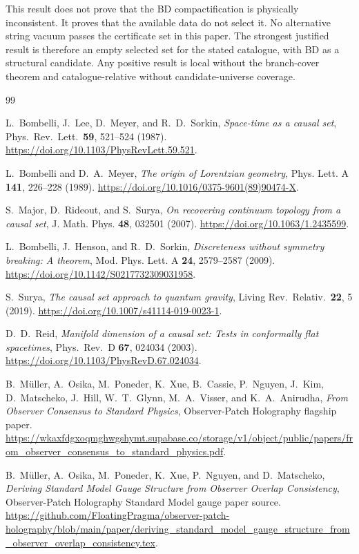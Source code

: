 \documentclass[11pt]{article}
\theoremstyle{remark}
\theoremstyle{plain}
\begin{document}
This result does not prove that the BD compactification is physically inconsistent. It proves that
the available data do not select it. No alternative string vacuum passes the certificate set in
this paper. The strongest justified result is therefore an empty selected set for the stated
catalogue, with BD as a structural candidate. Any positive result is local without
the branch-cover theorem and catalogue-relative without candidate-universe coverage.

\begin{thebibliography}{99}

L.~Bombelli, J.~Lee, D.~Meyer, and R.~D.~Sorkin,
\emph{Space-time as a causal set},
Phys.\ Rev.\ Lett.\ \textbf{59}, 521--524 (1987).
\url{https://doi.org/10.1103/PhysRevLett.59.521}.

L.~Bombelli and D.~A.~Meyer,
\emph{The origin of Lorentzian geometry},
Phys. Lett. A \textbf{141}, 226--228 (1989).
\url{https://doi.org/10.1016/0375-9601(89)90474-X}.

S.~Major, D.~Rideout, and S.~Surya,
\emph{On recovering continuum topology from a causal set},
J. Math. Phys. \textbf{48}, 032501 (2007).
\url{https://doi.org/10.1063/1.2435599}.

L.~Bombelli, J.~Henson, and R.~D.~Sorkin,
\emph{Discreteness without symmetry breaking: A theorem},
Mod. Phys. Lett. A \textbf{24}, 2579--2587 (2009).
\url{https://doi.org/10.1142/S0217732309031958}.

S.~Surya,
\emph{The causal set approach to quantum gravity},
Living Rev.\ Relativ.\ \textbf{22}, 5 (2019).
\url{https://doi.org/10.1007/s41114-019-0023-1}.

D.~D.~Reid,
\emph{Manifold dimension of a causal set: Tests in conformally flat spacetimes},
Phys.\ Rev.\ D \textbf{67}, 024034 (2003).
\url{https://doi.org/10.1103/PhysRevD.67.024034}.

B.\ M\"uller, A.\ Osika, M.\ Poneder, K.\ Xue, B.\ Cassie, P.\ Nguyen, J.\ Kim, D.\ Matscheko, J.\ Hill, W.\ T.\ Glynn, M.\ A.\ Visser, and K.\ A.\ Anirudha,
\emph{From Observer Consensus to Standard Physics},
Observer-Patch Holography flagship paper.
\url{https://wkaxfdgxoqmghwgshymt.supabase.co/storage/v1/object/public/papers/from_observer_consensus_to_standard_physics.pdf}.

B.\ M\"uller, A.\ Osika, M.\ Poneder, K.\ Xue, P.\ Nguyen, and D.\ Matscheko,
\emph{Deriving Standard Model Gauge Structure from Observer Overlap Consistency},
Observer-Patch Holography Standard Model gauge paper source.
\url{https://github.com/FloatingPragma/observer-patch-holography/blob/main/paper/deriving_standard_model_gauge_structure_from_observer_overlap_consistency.tex}.


\end{thebibliography}
\end{document}
